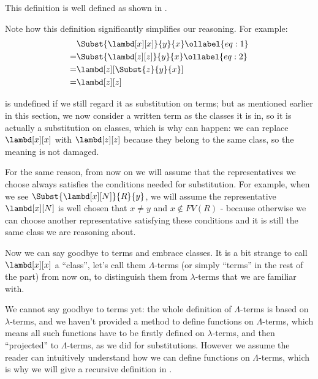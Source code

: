 \documentclass[../../../include/open-logic-section]{subfiles}
\begin{document}
This definition is well defined as shown in .

Note how this definition significantly simplifies our reasoning. For
example:
\begin{align}
  &\Subst{\lambd[x][x]}{y}{x} \ollabel{eq:1}\\
  =&\Subst{\lambd[z][z]}{y}{x} \ollabel{eq:2}\\
  =&\lambd[z][\Subst{z}{y}{x}] \\
  =&\lambd[z][z]
\end{align}

 is undefined if we still regard it as substitution on
terms; but as mentioned earlier in this section, we now consider a
written term as the classes it is in, so it is actually a substitution
on classes, which is why  can happen: we can replace
$\lambd[x][x]$ with $\lambd[z][z]$ because they belong to the same
class, so the meaning is not damaged.

For the same reason, from now on we will assume that the
representatives we choose always satisfies the conditions needed for
substitution. For example, when we see $\Subst{\lambd[x][N]}{R}{y}$,
we will assume the representative $\lambd[x][N]$ is well chosen that
$x \neq y$ and $x \notin FV(R)$ - because otherwise we can choose another
representative satisfying these conditions and it is still the same
class we are reasoning about.

Now we can say goodbye to terms and embrace classes. It is a bit
strange to call $\lambd[x][x]$ a ``class'', let's call them
$\Lambda$-terms (or simply ``terms'' in the rest of the part) from now on,
to distinguish them from $\lambda$-terms that we are familiar with. 

\begin{editorial}
  We cannot say goodbye to terms yet: the whole definition of
  $\Lambda$-terms is based on $\lambda$-terms, and we haven't provided
  a method to define functions on $\Lambda$-terms, which means all
  such functions have to be firstly defined  on $\lambda$-terms, and
  then ``projected'' to $\Lambda$-terms, as we did for substitutions.
  However we assume the reader can intuitively understand how we can
  define functions on $\Lambda$-terms, which is why we will give a
  recursive definition in .
\end{editorial}
\end{document}
